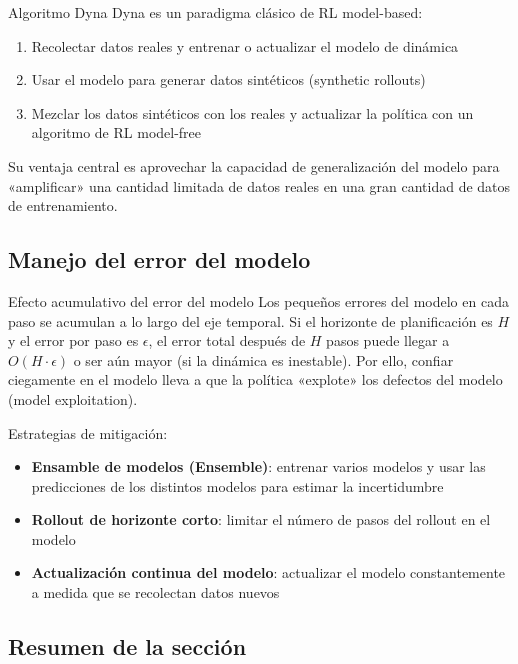 \documentclass[a4paper]{article}
\begin{document}
\begin{importantbox}{Algoritmo Dyna}
Dyna es un paradigma clásico de RL model-based:
\begin{enumerate}
    \item Recolectar datos reales y entrenar o actualizar el modelo de dinámica
    \item Usar el modelo para generar datos sintéticos (synthetic rollouts)
    \item Mezclar los datos sintéticos con los reales y actualizar la política con un algoritmo de RL model-free
\end{enumerate}
Su ventaja central es aprovechar la capacidad de generalización del modelo para «amplificar» una cantidad limitada de datos reales en una gran cantidad de datos de entrenamiento.
\end{importantbox}

\subsection{Manejo del error del modelo}

\begin{warningbox}{Efecto acumulativo del error del modelo}
Los pequeños errores del modelo en cada paso se acumulan a lo largo del eje temporal. Si el horizonte de planificación es $H$ y el error por paso es $\epsilon$, el error total después de $H$ pasos puede llegar a $O(H \cdot \epsilon)$ o ser aún mayor (si la dinámica es inestable). Por ello, confiar ciegamente en el modelo lleva a que la política «explote» los defectos del modelo (model exploitation).
\end{warningbox}

Estrategias de mitigación:
\begin{itemize}
    \item \textbf{Ensamble de modelos (Ensemble)}: entrenar varios modelos y usar las predicciones de los distintos modelos para estimar la incertidumbre
    \item \textbf{Rollout de horizonte corto}: limitar el número de pasos del rollout en el modelo
    \item \textbf{Actualización continua del modelo}: actualizar el modelo constantemente a medida que se recolectan datos nuevos
\end{itemize}

\subsection{Resumen de la sección}
\end{document}
